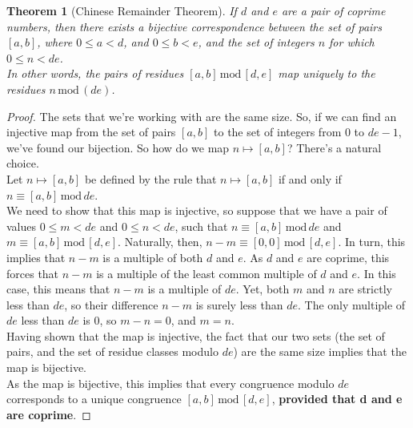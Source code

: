 \documentclass{article}
\newtheorem{theorem}{Theorem}
\newcommand{\X}[1]{\, \text{mod} \, #1}
\begin{document}
\begin{mdframed} 
\begin{theorem}[Chinese Remainder Theorem] 
If $d$ and $e$ are a pair of coprime numbers, then there exists a bijective correspondence between the set of pairs $[a, b]$, where $0\leq a < d$, and $0\leq b < e$, and the set of integers $n$ for which $0\leq n < de$. \\
In other words, the pairs of residues $[a, b]\X{[d, e]}$ map uniquely to the residues $n\X{(de)}$. 
\end{theorem} 
\begin{proof} 
The sets that we're working with are the same size. So, if we can find an injective map from the set of pairs $[a, b]$ to the set of integers from 0 to $de - 1$, we've found our bijection. So how do we map $n\mapsto [a, b]$? There's a natural choice. \\
Let $n\mapsto [a, b]$ be defined by the rule that $n\mapsto [a, b]$ if and only if $n\equiv[a, b]\X{de}$. \\
We need to show that this map is injective, so suppose that we have a pair of values $0\leq m < de$ and $0\leq n < de$, such that $n\equiv[a, b]\X{de}$ and $m\equiv[a, b]\X{[d, e]}$. Naturally, then, $n - m \equiv [0, 0]\X{[d, e]} $. In turn, this implies that $n - m$ is a multiple of both $d$ and $e$. As $d$ and $e$ are coprime, this forces that $n - m$ is a multiple of the least common multiple of $d$ and $e$. In this case, this means that $n - m$ is a multiple of $de$. Yet, both $m$ and $n$ are strictly less than $de$, so their difference $n - m$ is surely less than $de$. The only multiple of $de$ less than $de$ is 0, so $m - n = 0$, and $m = n$. \\
Having shown that the map is injective, the fact that our two sets (the set of pairs, and the set of residue classes modulo $de$) are the same size implies that the map is bijective. \\
As the map is bijective, this implies that every congruence modulo $de$ corresponds to a unique congruence $[a, b]\X{[d, e]}$, \textbf{provided that d and e are coprime}.  
\end{proof} 
\end{mdframed}  
\end{document}
